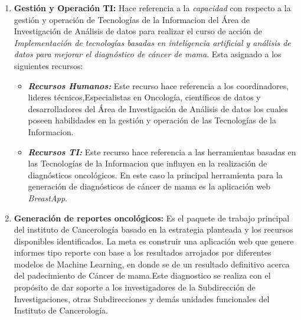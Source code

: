 \begin{enumerate}[label=\textbf{\arabic*})]
	

\item  \textbf{Gestión y Operación TI:} Hace referencia a la \textit{capacidad} con respecto a la gestión y operación de Tecnologías de  la Informacion del Área de Investigación de Análisis de datos para realizar el curso de acción de \textit{Implementación de tecnologías basadas en  inteligencia artificial y análisis de datos para 	mejorar  el diagnóstico de cáncer de mama}. Esta asignado a los siguientes recursos:
	
	\begin{itemize}
		\item  \textbf{\textit{Recursos Humanos:}} Este recurso hace referencia a los coordinadores, lideres técnicos,Especialistas en Oncología, científicos de datos  y desarrolladores del Área de Investigación de Análisis de datos los cuales poseen habilidades en la gestión y operación de las Tecnologías de la Informacion.
		\item  \textbf{\textit{Recursos TI:}} Este recurso hace referencia a las herramientas basadas en las Tecnologías de la Informacion que influyen en la realización de diagnósticos oncológicos. En este caso la principal herramienta para la generación de diagnósticos de cáncer de mama es la aplicación web \textit{BreastApp}.
	\end{itemize}

\item  \textbf{Generación de reportes oncológicos:} Es el paquete de trabajo principal del instituto de Cancerología basado en la estrategia planteada y los recursos disponibles identificados. La meta es construir una  aplicación web que genere  informes tipo reporte con base a los resultados arrojados por  diferentes modelos de Machine Learning, en donde se de un resultado definitivo acerca del  padecimiento de Cáncer de mama.Este diagnostico se realiza con el propósito de dar soporte a los investigadores de la Subdirección de Investigaciones, otras Subdirecciones y demás unidades funcionales del Instituto  de Cancerología.
	
\end{enumerate}













